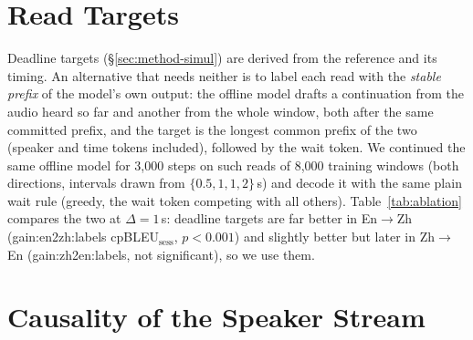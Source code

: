 \section{Read Targets}
\label{app:labels}



Deadline targets (\S\ref{sec:method-simul}) are derived from the reference and its timing. An alternative that needs
neither is to label each read with the \emph{stable prefix} of the model's own output: the offline model drafts a
continuation from the audio heard so far and another from the whole window, both after the same committed prefix, and
the target is the longest common prefix of the two (speaker and time tokens included), followed by the wait token. We
continued the same offline model for 3{,}000 steps on such reads of 8{,}000 training windows (both directions,
intervals drawn from $\{0.5,1,1,2\}$\,s) and decode it with the same plain wait rule (greedy, the wait token
competing with all others). Table~\ref{tab:ablation} compares
the two at $\Delta=1$\,s: deadline targets are far better in En$\rightarrow$Zh (\num{gain:en2zh:labels} cpBLEU$_\text{sess}$,
$p<0.001$) and slightly better but later in Zh$\rightarrow$En (\num{gain:zh2en:labels}, not significant), so we use them.

\section{Causality of the Speaker Stream}
\label{app:causal}

